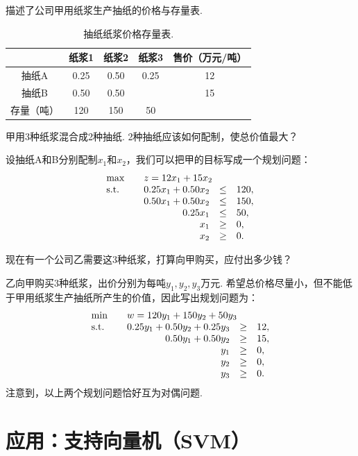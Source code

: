\begin{example}[线性规划的经济学解释]
 描述了公司甲用纸浆生产抽纸的价格与存量表. 
\begin{table}
        \centering
        \begin{tabular}{c|ccc|c}
        \hline
                 & 纸浆1&纸浆2&纸浆3&售价（万元/吨） \\
                 \hline
             抽纸A  & 0.25&0.50&0.25&12 \\
             抽纸B & 0.50&0.50& &15\\
             \hline
             存量（吨）&120&150&50& \\
             \hline
        \end{tabular}
        \caption{抽纸纸浆价格存量表. }
        \label{tab:cleaner}
\end{table}

甲用3种纸浆混合成2种抽纸. 2种抽纸应该如何配制，使总价值最大？

设抽纸A和B分别配制$x_1$和$x_2$，我们可以把甲的目标写成一个规划问题：
\begin{align*}
\begin{array}{lrcl}
\max\quad&\multicolumn{3}{l}{z=12x_1+15x_2}\\
\text{s.t.}\quad&0.25x_1+0.50x_2&\le&120,\\
&0.50x_1+0.50x_2&\le&150,\\
&0.25x_1&\le& 50,\\
&x_1&\ge& 0,\\
&x_2&\ge& 0.
\end{array}
\end{align*}

现在有一个公司乙需要这3种纸浆，打算向甲购买，应付出多少钱？

乙向甲购买3种纸浆，出价分别为每吨$y_1,y_2,y_3$万元. 希望总价格尽量小，但不能低于甲用纸浆生产抽纸所产生的价值，因此写出规划问题为：
\[
 \begin{array}{lrcl}
\min\quad&\multicolumn{3}{l}{w=120y_1+150y_2+50y_3} \\
\text{s.t.}\quad& 0.25y_1+0.50y_2+0.25y_3&\ge&12,\\
&0.50y_1+0.50y_2&\ge&15,\\
&y_1&\ge&0,\\
&y_2&\ge&0,\\
&y_3&\ge&0.
 \end{array}
\]
注意到，以上两个规划问题恰好互为对偶问题.
\end{example}

\section{应用：支持向量机（SVM）}

